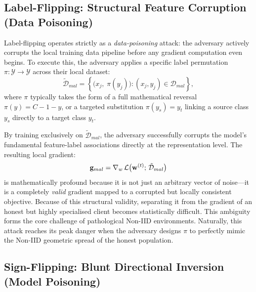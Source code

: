 \documentclass[../main]{subfiles}
\begin{document}
\subsection{Label-Flipping: Structural Feature Corruption (Data Poisoning)}
\label{sec:attack_label_flip}

Label-flipping operates strictly as a \emph{data-poisoning} attack: the adversary actively corrupts the local training data pipeline before any gradient computation even begins. To execute this, the adversary applies a specific label permutation $\pi: \mathcal{Y} \to \mathcal{Y}$ across their local dataset:
\begin{equation}
    \tilde{\mathcal{D}}_{mal} = \left\{ \bigl(x_j,\; \pi(y_j)\bigr) : (x_j, y_j) \in \mathcal{D}_{mal} \right\},
    \label{eq:label_flip}
\end{equation}
where $\pi$ typically takes the form of a full mathematical reversal $\pi(y) = C - 1 - y$, or a targeted substitution $\pi(y_s) = y_t$ linking a source class $y_s$ directly to a target class $y_t$.

By training exclusively on $\tilde{\mathcal{D}}_{mal}$, the adversary successfully corrupts the model's fundamental feature-label associations directly at the representation level. The resulting local gradient:
\begin{equation}
    \mathbf{g}_{mal} = \nabla_w \,\mathcal{L}\bigl(\mathbf{w}^{(t)};\, \tilde{\mathcal{D}}_{mal}\bigr)
    \label{eq:label_flip_grad}
\end{equation}
is mathematically profound because it is not just an arbitrary vector of noise---it is a completely \emph{valid} gradient mapped to a corrupted but locally consistent objective. Because of this structural validity, separating it from the gradient of an honest but highly specialised client becomes statistically difficult. This ambiguity forms the core challenge of pathological Non-IID environments. Naturally, this attack reaches its peak danger when the adversary designs $\pi$ to perfectly mimic the Non-IID geometric spread of the honest population.

\subsection{Sign-Flipping: Blunt Directional Inversion (Model Poisoning)}
\label{sec:attack_sign_flip}
\end{document}
